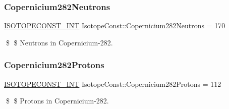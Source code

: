 \subsubsection{\texorpdfstring{Copernicium282\+Neutrons}{Copernicium282Neutrons}}
{\footnotesize\ttfamily \mbox{\hyperlink{group___isotope_const-_macros_ga5f18360b3e99483a35c32d789e62621c}{I\+S\+O\+T\+O\+P\+E\+C\+O\+N\+S\+T\+\_\+\+I\+NT}} Isotope\+Const\+::\+Copernicium282\+Neutrons = 170}

\$ \$ Neutrons in Copernicium-\/282. \mbox{\label{group___isotope_const-_copernicium-_cn282_ga651f00d51cb7caeb6cb51562510e4682}} 
\subsubsection{\texorpdfstring{Copernicium282\+Protons}{Copernicium282Protons}}
{\footnotesize\ttfamily \mbox{\hyperlink{group___isotope_const-_macros_ga5f18360b3e99483a35c32d789e62621c}{I\+S\+O\+T\+O\+P\+E\+C\+O\+N\+S\+T\+\_\+\+I\+NT}} Isotope\+Const\+::\+Copernicium282\+Protons = 112}

\$ \$ Protons in Copernicium-\/282. 